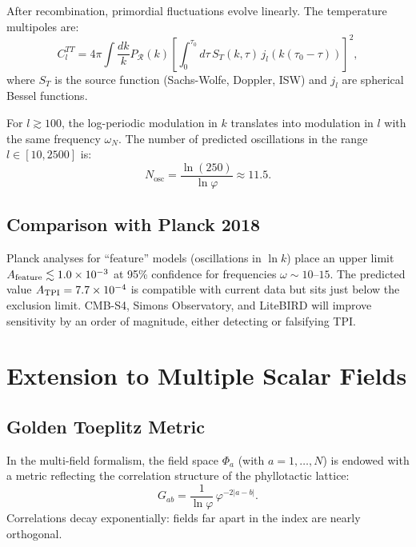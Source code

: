 \documentclass[11pt,a4paper]{article}
\theoremstyle{definition}
\begin{document}
After recombination, primordial fluctuations evolve linearly. The temperature multipoles are:
\begin{equation}
C_l^{TT} = 4\pi \int \frac{dk}{k} P_{\mathcal{R}}(k) \left[ \int_0^{\tau_0} d\tau \, S_T(k,\tau) \, j_l(k(\tau_0 - \tau)) \right]^2,
\end{equation}
where $S_T$ is the source function (Sachs-Wolfe, Doppler, ISW) and $j_l$ are spherical Bessel functions.

For $l \gtrsim 100$, the log-periodic modulation in $k$ translates into modulation in $l$ with the same frequency $\omega_N$. The number of predicted oscillations in the range $l \in [10, 2500]$ is:
\begin{equation}
N_{\text{osc}} = \frac{\ln(250)}{\ln\varphi} \approx 11.5.
\end{equation}

\subsection{Comparison with Planck 2018}

Planck analyses for ``feature'' models (oscillations in $\ln k$) place an upper limit $A_{\rm feature} \lesssim 1.0 \times 10^{-3}$ at 95\% confidence for frequencies $\omega \sim 10$--$15$. The predicted value $A_{\rm TPI} = 7.7 \times 10^{-4}$ is compatible with current data but sits just below the exclusion limit. CMB-S4, Simons Observatory, and LiteBIRD will improve sensitivity by an order of magnitude, either detecting or falsifying TPI.

\section{Extension to Multiple Scalar Fields}\label{sec:multifield}

\subsection{Golden Toeplitz Metric}

In the multi-field formalism, the field space $\Phi_a$ (with $a = 1, \dots, N$) is endowed with a metric reflecting the correlation structure of the phyllotactic lattice:
\begin{equation}\label{eq:metric}
G_{ab} = \frac{1}{\ln\varphi} \, \varphi^{-2|a-b|}.
\end{equation}
Correlations decay exponentially: fields far apart in the index are nearly orthogonal.
\end{document}
